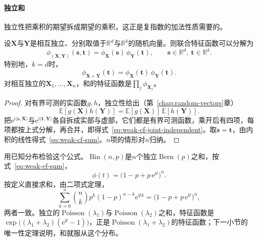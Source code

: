 \paragraph{独立和}
独立性把乘积的期望拆成期望的乘积，这正是复指数的加法性质需要的。

\begin{theorem}[独立和的特征函数]
\label{thm:weak-cf-independent}
设$\bm{X}$与$\bm{Y}$是相互独立、分别取值于$\mathbb{R}^{d}$与$\mathbb{R}^{k}$的随机向量。则联合特征函数可以分解为
\begin{equation}
 \phi_{(\bm{X},\bm{Y})}(\bm{s},\bm{t})=\phi_{\bm{X}}(\bm{s})\,\phi_{\bm{Y}}(\bm{t}),\qquad\bm{s}\in\mathbb{R}^{d},\ \bm{t}\in\mathbb{R}^{k} .
 \label{eq:weak-cf-joint-independent}
\end{equation}
特别地，$k=d$时，
\begin{equation}
 \phi_{\bm{X}+\bm{Y}}(\bm{t})=\phi_{\bm{X}}(\bm{t})\,\phi_{\bm{Y}}(\bm{t}) .
 \label{eq:weak-cf-sum}
\end{equation}
对相互独立的$\bm{X}_1,\dots,\bm{X}_n$，和的特征函数是$\prod_{j}\phi_{\bm{X}_j}$。
\end{theorem}

\begin{proof}
对有界可测的实函数$g,h$，独立性给出（第~\ref{chap:random-vectors}章）
\[
 \mathbb{E}[g(\bm{X})h(\bm{Y})]=\mathbb{E}[g(\bm{X})]\,\mathbb{E}[h(\bm{Y})] .
\]
把$\mathrm{e}^{\mathrm{i}\langle\bm{s},\bm{X}\rangle}$与$\mathrm{e}^{\mathrm{i}\langle\bm{t},\bm{Y}\rangle}$各自拆成实部与虚部，它们都是有界可测函数，乘开后有四项，每项都按上式分解，再合并，即得式~\eqref{eq:weak-cf-joint-independent}。取$\bm{s}=\bm{t}$，由内积的线性得式~\eqref{eq:weak-cf-sum}。$n$项的情形对$n$归纳。
\end{proof}

用已知分布检验这个公式。$\operatorname{Bin}(n,p)$是$n$个独立$\operatorname{Bern}(p)$之和，按式~\eqref{eq:weak-cf-sum}，
\[
 \phi(t)=\bigl(1-p+p\,\mathrm{e}^{\mathrm{i}t}\bigr)^{n} .
\]
按定义直接求和，由二项式定理，
\[
 \sum_{k=0}^{n}\binom nkp^{k}(1-p)^{n-k}\mathrm{e}^{\mathrm{i}tk}=\bigl(1-p+p\,\mathrm{e}^{\mathrm{i}t}\bigr)^{n} ,
\]
两者一致。独立的$\operatorname{Poisson}(\lambda_1)$与$\operatorname{Poisson}(\lambda_2)$之和，特征函数是$\exp\bigl((\lambda_1+\lambda_2)(\mathrm{e}^{\mathrm{i}t}-1)\bigr)$，正是$\operatorname{Poisson}(\lambda_1+\lambda_2)$的特征函数；下一小节的唯一性定理说明，和就服从这个分布。

